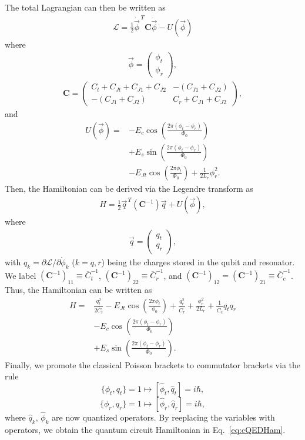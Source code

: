 The total Lagrangian can then be written as
\begin{align}
    \mathcal{L}=\frac{1}{2}\dot{\vec{\phi}}^{\,T} \boldsymbol{C} \dot{\vec{\phi}} - U(\vec{\phi})
\end{align}
where
\begin{align}
    \vec{\phi}=\begin{pmatrix}
        \phi_t \\ \phi_r
    \end{pmatrix},
\end{align}
\begin{align}
\boldsymbol{C}=\begin{pmatrix}
                C_t+C_{Jt}+C_{J1}+C_{J2} & -(C_{J1}+C_{J2}) \\
                -(C_{J1}+C_{J2}) & C_r+C_{J1}+C_{J2}
\end{pmatrix},    
\end{align}
and
\begin{align}
    U(\vec{\phi})=& -E_{c}\cos(\frac{2\pi (\phi_t-\phi_r)}{\Phi_0})\nonumber\\ & + E_{s}\sin(\frac{2\pi ( \phi_t-\phi_r)}{\Phi_0})\nonumber\\ &-E_{Jt}\cos(\frac{2\pi \phi_t}{\Phi_0}) + \frac{1}{2L_r}\phi_r^2.
\end{align}
Then, the Hamiltonian can be derived via the Legendre transform as
\begin{align}
    H=\frac{1}{2}\vec{q}^{\,T} (\boldsymbol{C}^{-1})\vec{q}+ U(\vec{\phi}),
\end{align}
where
\begin{align}
    \vec{q}=\begin{pmatrix}
        q_t \\ q_r
    \end{pmatrix},
\end{align}
with $q_k=\partial \mathcal{L}/\partial \dot{\phi}_k$ ($k=q,r$) being the charges stored in the qubit and resonator. We label $(\boldsymbol{C}^{-1})_{11}\equiv \overline{C}_t^{-1}$, $(\boldsymbol{C}^{-1})_{22}\equiv \overline{C}_r^{-1}$, and $(\boldsymbol{C}^{-1})_{12}=(\boldsymbol{C}^{-1})_{21}\equiv \overline{C}_{c}^{-1}$. Thus, the Hamiltonian can be written as
\begin{align}
    H=&\frac{q_t^2}{2 \overline{C}_t}- E_{Jt}\cos(\frac{2\pi \phi_t}{\phi_0}) + \frac{q_r^2}{\overline{C}_r}+\frac{\phi_r^2}{2 L_r} +\frac{1}{\overline{C}_c}q_t q_r \nonumber\\ &- E_{c}\cos(\frac{2\pi ( \phi_t-\phi_r)}{\Phi_0})\nonumber\\  &+E_{s}\sin(\frac{2\pi ( \phi_t-\phi_r)}{\Phi_0}).
\end{align} 
Finally, we promote the classical Poisson brackets to commutator brackets via the rule $$\{\phi_t,q_t\}{=1}\mapsto [\hat{\phi}_t,\hat{q}_t]=i\hbar,$$
$$\{\phi_r,q_r\}{=1}\mapsto [\hat{\phi}_r,\hat{q}_r]=i\hbar,$$
where $\hat{q}_k,\,\hat{\phi}_k$ are now quantized operators. By reeplacing the variables with operators, we obtain the quantum circuit Hamiltonian in Eq.~\eqref{eq:cQEDHam}.


